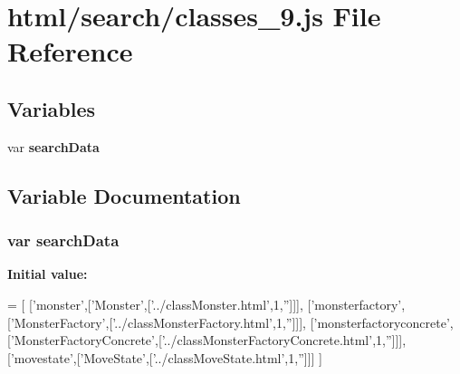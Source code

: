 \section{html/search/classes\-\_\-9.js File Reference}
\label{classes__9_8js}
\subsection*{Variables}
\begin{DoxyCompactItemize}
\item 
var {\bf search\-Data}
\end{DoxyCompactItemize}


\subsection{Variable Documentation}
\subsubsection[{search\-Data}]{\setlength{\rightskip}{0pt plus 5cm}var search\-Data}\label{classes__9_8js_ad01a7523f103d6242ef9b0451861231e}
{\bfseries Initial value\-:}
\begin{DoxyCode}
=
[
  [\textcolor{stringliteral}{'monster'},[\textcolor{stringliteral}{'Monster'},[\textcolor{stringliteral}{'../classMonster.html'},1,\textcolor{stringliteral}{''}]]],
  [\textcolor{stringliteral}{'monsterfactory'},[\textcolor{stringliteral}{'MonsterFactory'},[\textcolor{stringliteral}{'../classMonsterFactory.html'},1,\textcolor{stringliteral}{''}]]],
  [\textcolor{stringliteral}{'monsterfactoryconcrete'},[\textcolor{stringliteral}{'MonsterFactoryConcrete'},[\textcolor{stringliteral}{'../classMonsterFactoryConcrete.html'},1,\textcolor{stringliteral}{''}]]],
  [\textcolor{stringliteral}{'movestate'},[\textcolor{stringliteral}{'MoveState'},[\textcolor{stringliteral}{'../classMoveState.html'},1,\textcolor{stringliteral}{''}]]]
]
\end{DoxyCode}
